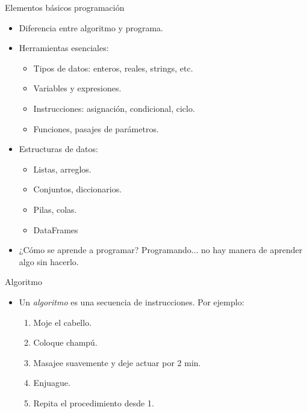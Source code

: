 \documentclass{beamer}
\begin{document}
\begin{frame}{Elementos básicos programación} \pause
\begin{itemize}
	\item Diferencia entre algoritmo y programa.\pause
	\item Herramientas esenciales:
	\begin{itemize}
		\item Tipos de datos: enteros, reales, strings, etc.%
		\item Variables y expresiones.%
		\item Instrucciones: asignación, condicional, ciclo.%
		\item Funciones, pasajes de parámetros.
	\end{itemize}\pause
	\item Estructuras de datos:
	\begin{itemize}
		\item Listas, arreglos.
		\item Conjuntos, diccionarios.
		\item Pilas, colas.
		\item DataFrames
	\end{itemize}\pause
	\item ¿Cómo se aprende a programar? \pause Programando... no hay manera de aprender algo sin hacerlo.
\end{itemize}
\end{frame}




\begin{frame}{Algoritmo} \pause
\begin{itemize}
	\item Un \emph{algoritmo} es una secuencia de instrucciones. Por ejemplo:\pause
		\begin{enumerate}
		\item Moje el cabello. \pause
		\item Coloque champú.\pause
		\item Masajee suavemente y deje actuar por 2 min.\pause
		\item Enjuague. \pause
		\item Repita el procedimiento desde 1.
		\end{enumerate}
\end{itemize}
\end{frame}
\end{document}
